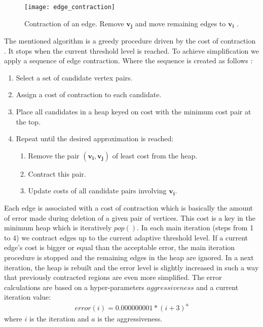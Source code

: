 \begin{figure}[h!]
  \begin{center}
    \texttt{[image: edge\_contraction]}
    \caption{Contraction of an edge. Remove $\mathbf{v_j}$ and move remaining edges to $\mathbf{v_i}$ \cite{garland99}.}
    \label{fig:edge_contraction_ref}
  \end{center}
\end{figure}

The mentioned algorithm is a greedy procedure driven by the cost of contraction \cite{cormen01}. It stops when the current threshold level is reached. To achieve simplification we apply a sequence of edge contraction. Where the sequence is created as follows \cite{garland97}:

\begin{enumerate}
\item Select a set of candidate vertex pairs.
\item Assign a cost of contraction to each candidate.
\item Place all candidates in a heap keyed on cost with the minimum cost pair at the top.
\item Repeat until the desired approximation is reached:
\begin{enumerate}
\item Remove the pair $(\mathbf{v_i}, \mathbf{v_j})$ of least cost from the heap.
\item Contract this pair.
\item Update costs of all candidate pairs involving $\mathbf{v_i}$.
\end{enumerate}
\end{enumerate}

Each edge is associated with a cost of contraction which is basically the amount of error made during deletion of a given pair of vertices. This cost is a key in the minimum heap \cite{cormen01} which is iteratively $pop()$. In each main iteration (steps from 1 to 4) we contract edges up to the current adaptive threshold level. If a current edge's cost is bigger or equal than the acceptable error, the main iteration procedure is stopped and the remaining edges in the heap are ignored. In a next iteration, the heap is rebuilt and the error level is slightly increased in such a way that previously contracted regions are even more simplified. The error calculations are based on a hyper-parameters $aggressiveness$ and a current iteration value:
\begin{align}
error(i)=0.000000001*(i+3)^a
\label{error_formula}
\end{align}
where $i$ is the iteration and $a$ is the aggressiveness.

